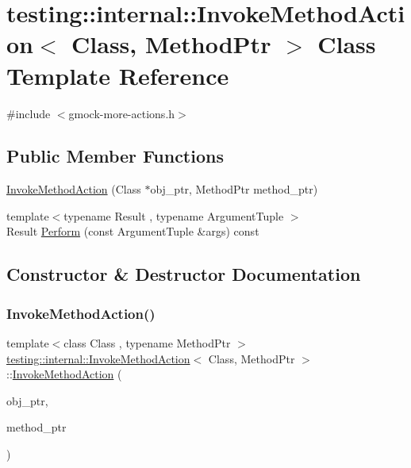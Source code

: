 \hypertarget{classtesting_1_1internal_1_1InvokeMethodAction}{}\section{testing\+::internal\+::Invoke\+Method\+Action$<$ Class, Method\+Ptr $>$ Class Template Reference}
\label{classtesting_1_1internal_1_1InvokeMethodAction}


{\ttfamily \#include $<$gmock-\/more-\/actions.\+h$>$}

\subsection*{Public Member Functions}
\begin{DoxyCompactItemize}
\item 
\mbox{\hyperlink{classtesting_1_1internal_1_1InvokeMethodAction_a16e545f6166e2d54eeafdc2ab3adf06b}{Invoke\+Method\+Action}} (Class $\ast$obj\+\_\+ptr, Method\+Ptr method\+\_\+ptr)
\item 
{\footnotesize template$<$typename Result , typename Argument\+Tuple $>$ }\\Result \mbox{\hyperlink{classtesting_1_1internal_1_1InvokeMethodAction_aed6971c668bc2c7671d512306b25b1ab}{Perform}} (const Argument\+Tuple \&args) const
\end{DoxyCompactItemize}


\subsection{Constructor \& Destructor Documentation}
\mbox{\label{classtesting_1_1internal_1_1InvokeMethodAction_a16e545f6166e2d54eeafdc2ab3adf06b}} 
\subsubsection{\texorpdfstring{InvokeMethodAction()}{InvokeMethodAction()}}
{\footnotesize\ttfamily template$<$class Class , typename Method\+Ptr $>$ \\
\mbox{\hyperlink{classtesting_1_1internal_1_1InvokeMethodAction}{testing\+::internal\+::\+Invoke\+Method\+Action}}$<$ Class, Method\+Ptr $>$\+::\mbox{\hyperlink{classtesting_1_1internal_1_1InvokeMethodAction}{Invoke\+Method\+Action}} (\begin{DoxyParamCaption}\item[{Class $\ast$}]{obj\+\_\+ptr,  }\item[{Method\+Ptr}]{method\+\_\+ptr }\end{DoxyParamCaption})\hspace{0.3cm}{\ttfamily [inline]}}



